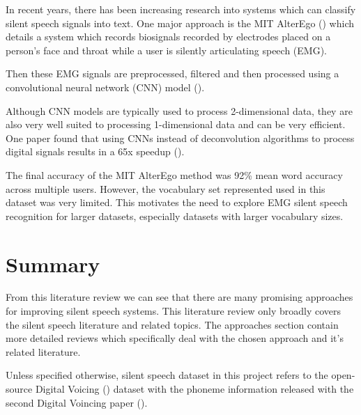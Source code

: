 In recent years, there has been increasing research into systems
which can classify silent speech signals into text. One major approach
is the MIT AlterEgo (\cite{alter_ego}) which details a system which 
records biosignals recorded by electrodes placed on a person's face and
throat while a user is silently articulating speech (EMG).

Then these EMG signals are preprocessed, filtered and then processed
using a convolutional neural network (CNN) model (\cite{cnn_def}).

Although CNN models are typically used
to process 2-dimensional data, they are also very well suited
to processing 1-dimensional data and can be very efficient. One
paper found that using CNNs instead of deconvolution algorithms
to process digital signals results in a 65x speedup (\cite{cnn_dsp}).

The final accuracy of the MIT AlterEgo method 
was 92\% mean word accuracy across multiple
users. However, the vocabulary set represented used in this dataset
was very limited. This motivates the need to explore
EMG silent speech recognition for larger datasets, especially datasets
with larger vocabulary sizes.

\section{Summary}

From this literature review we can see that there are many promising approaches
for improving silent speech systems. This literature review only broadly
covers the silent speech literature and related topics.
The approaches section contain more detailed reviews which
specifically deal with the chosen approach and it's related literature.

Unless specified otherwise, silent speech dataset in this project
refers to the open-source Digital Voicing (\cite{gaddy2020digital})
dataset with the phoneme information
released with the second Digital Voincing paper (\cite{gaddy2021improved}).